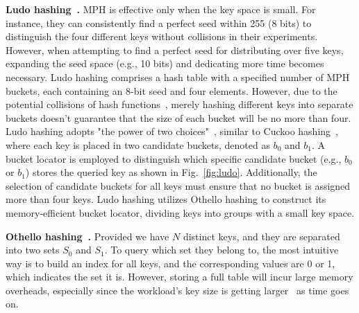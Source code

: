 \noindent\textbf{Ludo hashing~\cite{ludo}.}
MPH is effective only when the key space is small. For instance, they can consistently find a perfect seed within 255 (8 bits) to distinguish the four different keys without collisions in their experiments.
However, when attempting to find a perfect seed for distributing over five keys, expanding the seed space (e.g., 10 bits) and dedicating more time becomes necessary.
Ludo hashing comprises a hash table with a specified number of MPH buckets, each containing an 8-bit seed and four elements. 
However, due to the potential collisions of hash functions~\cite{can}, merely hashing different keys into separate buckets doesn't guarantee that the size of each bucket will be no more than four. Ludo hashing adopts "the power of two choices"~\cite{twochoices}, similar to Cuckoo hashing~\cite{cuckoo}, where each key is placed in two candidate buckets, denoted as $b_0$ and $b_1$.
A bucket locator is employed to distinguish which specific candidate bucket (e.g., $b_0$ or $b_1$) stores the queried key as shown in Fig.~\ref{fig:ludo}. Additionally, the selection of candidate buckets for all keys must ensure that no bucket is assigned more than four keys. Ludo hashing utilizes Othello hashing to construct its memory-efficient bucket locator, dividing keys into groups with a small key space.

\noindent\textbf{Othello hashing~\cite{othello}.}
Provided we have $N$ distinct keys, and they are separated into two sets $S_0$ and $S_1$. To query which set they belong to, the most intuitive way is to build an index for all keys, and the corresponding values are 0 or 1, which indicates the set it is. However, storing a full table will incur large memory overheads, especially since the workload's key size is getting larger~\cite{workload} as time goes on.

